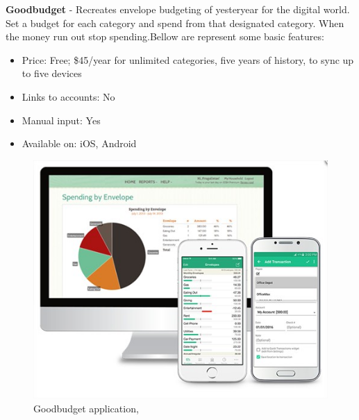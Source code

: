 \textbf{Goodbudget} - Recreates envelope budgeting of yesteryear for the digital world. Set a budget for each category and spend from that designated category. When the money run out stop spending.Bellow are represent some basic features:
\begin{itemize}
	\item Price: Free; \$45/year for unlimited categories, five years of history, to sync up to five devices
	\item Links to accounts: No
	\item Manual input: Yes
	\item Available on: iOS, Android
\end{itemize}
\begin{figure}[H]
	\centering
	\includegraphics[width=12cm]{Chapter1/Goodbudget.jpg}
	\caption{Goodbudget application, \cite{Goodbudget}}
	\label{fig:Goodbudget}
\end{figure}

